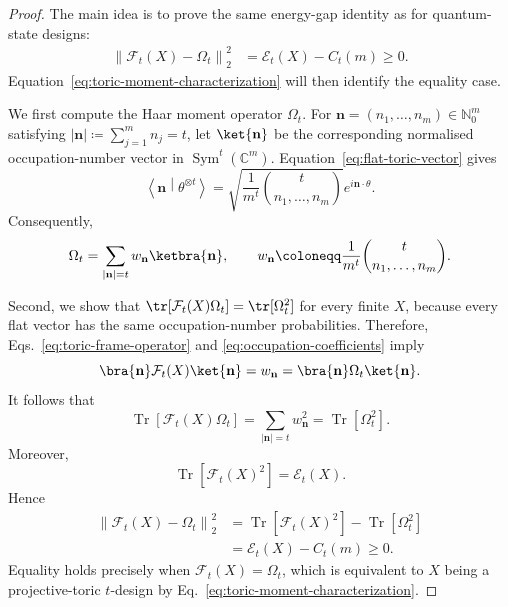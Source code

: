 \documentclass[aps,twocolumn,pra,superscriptaddress,nofootinbib]{revtex4-2}
\newcommand{\mF}{\mathcal{F}}
\begin{document}
\begin{proof}
The main idea is to prove the same energy-gap identity as for
quantum-state designs:
\begin{align}
    \left\|\mF_{t}(X)-\Omega_{t}\right\|_{2}^{2}
    &=\mathcal{E}_{t}(X)
    -
    C_{t}(m)\geq 0.
\end{align}
Equation~\eqref{eq:toric-moment-characterization} will then identify the
equality case.

We first compute the Haar moment operator $\Omega_t$. For
$\mathbf{n}=(n_1,\ldots,n_m)\in\mathbb{N}_0^m$ satisfying
$|\mathbf{n}|\coloneqq\sum_{j=1}^m n_j=t$, let $\ket{\mathbf n}$ be the
corresponding normalised occupation-number vector in
$\operatorname{Sym}^{t}(\mathbb{C}^{m})$.
Equation~\eqref{eq:flat-toric-vector} gives
\begin{equation}
    \left\langle
        \mathbf n
        \middle|
        \theta^{\otimes t}
    \right\rangle
    =
    \sqrt{
        \frac{1}{m^{t}}
        \binom{t}{n_{1},\ldots,n_{m}}
    }
    e^{i\mathbf n\cdot\theta}.
    \label{eq:occupation-coefficients}
\end{equation}
Consequently,
\begin{equation}
    \Omega_{t}
    =
    \sum_{|\mathbf n|=t}
    w_{\mathbf n}
    \ketbra{\mathbf n},
    \qquad
    w_{\mathbf n}
    \coloneqq
    \frac{1}{m^{t}}
    \binom{t}{n_{1},\ldots,n_{m}}.
    \label{eq:toric-Haar-diagonalization}
\end{equation}

Second, we show that
$\tr[\mF_t(X)\Omega_t]=\tr[\Omega_t^2]$ for every finite $X$, because
every flat vector has the same occupation-number probabilities.
Therefore, Eqs.~\eqref{eq:toric-frame-operator} and
\eqref{eq:occupation-coefficients} imply
\begin{equation}
    \bra{\mathbf n}\mF_{t}(X)\ket{\mathbf n}
    =
    w_{\mathbf n}
    =
    \bra{\mathbf n}\Omega_{t}\ket{\mathbf n}.
\end{equation}
It follows that
\begin{equation}
    \operatorname{Tr}\!\left[\mF_{t}(X)\Omega_{t}\right]
    =
    \sum_{|\mathbf n|=t}w_{\mathbf n}^{2}
    =
    \operatorname{Tr}\!\left[\Omega_{t}^{2}\right].
\end{equation}
Moreover,
\begin{equation}
    \operatorname{Tr}\!\left[\mF_{t}(X)^{2}\right]
    =
    \mathcal{E}_{t}(X).
\end{equation}
Hence
\begin{align}
    \left\|\mF_{t}(X)-\Omega_{t}\right\|_{2}^{2}
    &=
    \operatorname{Tr}\!\left[\mF_{t}(X)^{2}\right]
    -
    \operatorname{Tr}\!\left[\Omega_{t}^{2}\right]
    \nonumber\\
    &=
    \mathcal{E}_{t}(X)
    -
    C_{t}(m)\geq 0.
    \label{eq:toric-energy-gap}
\end{align}
Equality holds precisely when $\mF_t(X)=\Omega_t$, which is equivalent
to $X$ being a projective-toric $t$-design by
Eq.~\eqref{eq:toric-moment-characterization}.
\end{proof}
\end{document}
